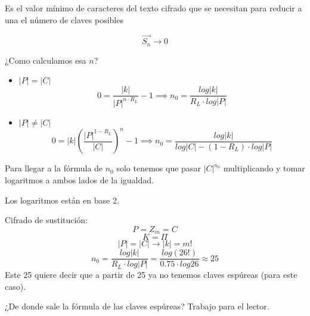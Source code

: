 \begin{defn}
	
Es el valor mínimo de caracteres del texto cifrado que se necesitan para reducir a una el número de claves posibles

$$\overrightarrow{S_n} \rightarrow 0$$

¿Como calculamos esa $n$?
\begin{itemize}
	\item $|P|= |C|$
		$$0 = \frac{|k|}{|P|^{n \cdot R_L}} -1 \implies n_0 = \frac{log|k|}{R_L\cdot log|P|}$$ 
	\item $|P| \neq |C|$
		$$0 =|k| \left(\frac{|P|^{1-R_L}}{|C|}\right)^n -1 \implies n_0 = \frac{log|k|}{log|C| -(1-R_L)\cdot log|P|}$$ 
\end{itemize}

\begin{remark}
	Para llegar a la fórmula de $n_0$ solo tenemos que pasar $|C|^{n_0}$ multiplicando y tomar logaritmos a ambos lados de la igualdad.
	
	Los logaritmos están en base 2.
\end{remark}

\end{defn}


\begin{example}
	Cifrado de sustitución:
	$$P= Z_m = C$$
	$$K = \Pi$$
	$$|P|=|C| \rightarrow |k| = m!$$
	$$n_0 = \frac{log|k|}{R_L\cdot log|P|} = \frac{log( 26!)}{0.75 \cdot log 26} \approx 25$$
	Este 25 quiere decir que a partir de 25 ya no tenemos claves espúreas (para este caso).
\end{example}

¿De donde sale la fórmula de las claves espúreas? Trabajo para el lector.


